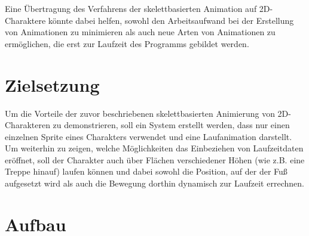Eine Übertragung des Verfahrens der skelettbasierten Animation auf 2D-Charaktere könnte dabei helfen, sowohl den Arbeitsaufwand bei der Erstellung von Animationen zu minimieren als auch neue Arten von Animationen zu ermöglichen, die erst zur Laufzeit des Programms gebildet werden.

\section{Zielsetzung}
Um die Vorteile der zuvor beschriebenen skelettbasierten Animierung von 2D-Charakteren zu demonstrieren, soll ein System erstellt werden, dass nur einen einzelnen Sprite eines Charakters verwendet und eine Laufanimation darstellt. Um weiterhin zu zeigen, welche Möglichkeiten das Einbeziehen von Laufzeitdaten eröffnet, soll der Charakter auch über Flächen verschiedener Höhen (wie z.B. eine Treppe hinauf) laufen können und dabei sowohl die Position, auf der der Fuß aufgesetzt wird als auch die Bewegung dorthin dynamisch zur Laufzeit errechnen.

\section{Aufbau}